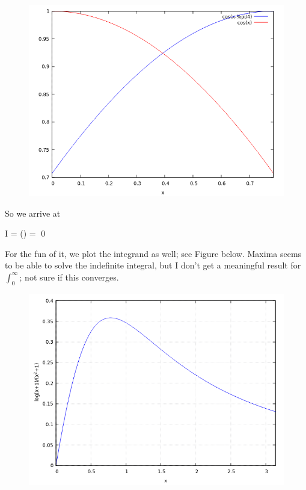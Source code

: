 \begin{figure}[hbt!]
\centering
\includegraphics[scale=0.75]{images/interesting_integrals_09_1.png}
\end{figure}

So we arrive at

\bee
I =  \ln() =    \qed
\eee

For the fun of it, we plot the integrand as well; see Figure below. Maxima seems to be able to solve the indefinite integral, but I don't get a meaningful result for $\int_0^\infty$; not sure if this converges.

\begin{figure}[hbt!]
\centering
\includegraphics[scale=0.75]{images/interesting_integrals_09_2.png}
\end{figure}



